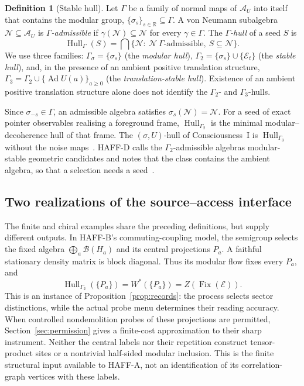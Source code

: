 \documentclass[12pt]{article}
\theoremstyle{definition}
\newtheorem{definition}[theorem]{Definition}
\theoremstyle{remark}
\newcommand{\Fix}{\operatorname{Fix}}
\newcommand{\Hull}{\operatorname{Hull}}
\newcommand{\AU}{\mathcal A_U}
\newcommand{\Ad}{\operatorname{Ad}}
\begin{document}
\begin{definition}[Stable hull]\label{def:hull}
Let \(\Gamma\) be a family of normal maps of \(\AU\) into itself that contains the
modular group, \(\{\sigma_s\}_{s\in\mathbb R}\subseteq\Gamma\). A von Neumann
subalgebra \(\mathcal N\subseteq\AU\) is \emph{\(\Gamma\)-admissible} if
\(\gamma(\mathcal N)\subseteq\mathcal N\) for every \(\gamma\in\Gamma\). The
\emph{\(\Gamma\)-hull} of a seed \(S\) is
\[
\Hull_\Gamma(S)=\bigcap\{\mathcal N:\ \mathcal N\ \Gamma\text{-admissible},\ S\subseteq\mathcal N\}.
\]
We use three families: \(\Gamma_\sigma=\{\sigma_s\}\) (the \emph{modular hull}),
\(\Gamma_2=\{\sigma_s\}\cup\{\mathcal E_t\}\) (the \emph{stable hull}), and, in the
presence of an ambient positive translation structure,
\(\Gamma_3=\Gamma_2\cup\{\Ad U(a)\}_{a\ge0}\)
(the \emph{translation-stable hull}). Existence of an ambient positive translation structure alone does not
identify the \(\Gamma_2\)- and \(\Gamma_3\)-hulls.
\end{definition}

Since \(\sigma_{-s}\in\Gamma\), an admissible algebra satisfies
\(\sigma_s(\mathcal N)=\mathcal N\). For a seed of exact pointer observables
realising a foreground frame, \(\Hull_{\Gamma_2}\) is the minimal modular--decoherence
hull of that frame. The \((\sigma,U)\)-hull of Consciousness~I is \(\Hull_{\Gamma_3}\) without the noise
maps~\cite{PaperI}. HAFF-D calls the \(\Gamma_2\)-admissible algebras modular-stable
geometric candidates and notes that the class contains the ambient algebra, so that a
selection needs a seed~\cite{HAFFD}.

\subsection{Two realizations of the source--access interface}\label{sec:typed-interface}

The finite and chiral examples share the preceding definitions, but supply
different outputs. In HAFF-B's commuting-coupling model, the semigroup selects
the fixed algebra \(\bigoplus_a\mathcal B(H_a)\) and its central projections
\(P_a\). A faithful stationary density matrix is block diagonal. Thus its
modular flow fixes every \(P_a\), and
\[
  \Hull_{\Gamma_2}(\{P_a\})=W^*(\{P_a\})
       =Z(\Fix(\mathcal E)).
\]
This is an instance of Proposition~\ref{prop:records}: the process selects
sector distinctions, while the actual probe menu determines their reading
accuracy. When controlled nondemolition probes of these projections are
permitted, Section~\ref{sec:permission} gives a finite-cost approximation
to their sharp instrument. Neither the central labels nor their repetition
construct tensor-product sites or a nontrivial half-sided modular inclusion.
This is the finite structural input available to HAFF-A, not an identification
of its correlation-graph vertices with these labels.
\end{document}
